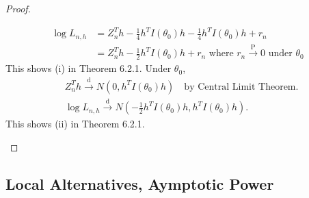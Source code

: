 \documentclass[a4paper]{article}
\begin{document}
\begin{proof}
\begin{itemize}[leftmargin=*]
		\begin{equation}
			\begin{aligned}
				\log L_{n,h} &= Z_n^Th - \frac{1}{4} h^T I(\theta_0) h - \frac{1}{4} h^T I(\theta_0) h + r_n \\
				&= Z_n^Th - \frac{1}{2} h^T I(\theta_0) h + r_n \text{ where $r_n \stackrel{\text{P}}{\longrightarrow} 0$ under $\theta_0$}
			\end{aligned}
		\end{equation}
		This shows (i) in Theorem 6.2.1. Under $\theta_0$,
		\begin{equation}
			\begin{aligned}
				& Z_n^T h \stackrel{\text{d}}{\longrightarrow} N\left(0,h^TI(\theta_0)h\right) \quad \text{by Central Limit Theorem.} \\
				& \log L_{n,h} \stackrel{\text{d}}{\longrightarrow} N\left(- \frac{1}{2} h^T I(\theta_0) h, h^T I(\theta_0) h\right).
			\end{aligned}
		\end{equation}
		This shows (ii) in Theorem 6.2.1.
	\end{itemize}
\end{proof}

\subsection{Local Alternatives, Aymptotic Power}
\end{document}
